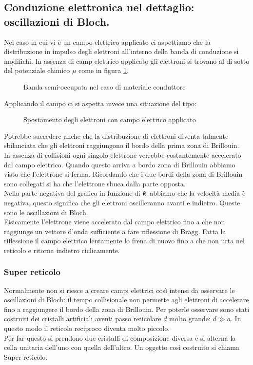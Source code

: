 \subsection{Conduzione elettronica nel dettaglio: oscillazioni di Bloch.}
\label{subsec:Conduzione elettronica nel dettaglio.}
Nel caso in cui vi è un campo elettrico applicato ci aspettiamo che la distribuzione in impulso degli elettroni all'interno della banda di conduzione si modifichi. In assenza di camp elettrico applicato gli elettroni si trovano al di sotto del potenziale chimico $\mu$ come in figura \ref{fig:banda-semi-occupata-nel-caso-di-materiale-conduttore}.
\begin{figure}[H]
    \centering
    \caption{Banda semi-occupata nel caso di materiale conduttore}
    \label{fig:banda-semi-occupata-nel-caso-di-materiale-conduttore}
\end{figure}
\noindent
Applicando il campo ci si aspetta invece una situazione del tipo:
\begin{figure}[H]
    \centering
    \caption{Spostamento degli elettroni con campo elettrico applicato}
    \label{fig:spostamento-degli-elettroni-con-campo-elettrico-applicato}
\end{figure}
\noindent
Potrebbe succedere anche che la distribuzione di elettroni diventa talmente sbilanciata che gli elettroni raggiungono il bordo della prima zona di Brillouin.\\
In assenza di collisioni ogni singolo elettrone verrebbe costantemente accelerato dal campo elettrico. Quando questo arriva a bordo zona di Brillouin abbiamo visto che l'elettrone si ferma. Ricordando che i due bordi della zona di Brillouin sono collegati si ha che l'elettrone sbuca dalla parte opposta.\\
Nella parte negativa del grafico in funzione di $\boldsymbol{k}$ abbiamo che la velocità media è negativa, questo significa che gli elettroni oscilleranno avanti e indietro. Queste sono le oscillazioni di Bloch.\\
Fisicamente l'elettrone viene accelerato dal campo elettrico fino a che non raggiunge un vettore d'onda sufficiente a fare riflessione di Bragg. Fatta la riflessione il campo elettrico lentamente lo frena di nuovo fino a che non urta nel reticolo e ritorna indietro ciclicamente. 
\subsubsection{Super reticolo}
\label{subsubsec:Super reticolo}
Normalmente non si riesce a creare campi elettrici così intensi da osservare le oscillazioni di Bloch: il tempo  collisionale non permette agli elettroni di accelerare fino a raggiungere il bordo della zona di Brillouin.
Per poterle osservare sono stati costruiti dei cristalli artificiali aventi passo reticolare $d$ molto grande: $d \gg a$. In questo modo il reticolo reciproco diventa molto piccolo. \\
Per far questo si prendono due cristalli di composizione diversa e si alterna la cella unitaria dell'uno con quella dell'altro. Un oggetto così costruito si chiama Super reticolo.

